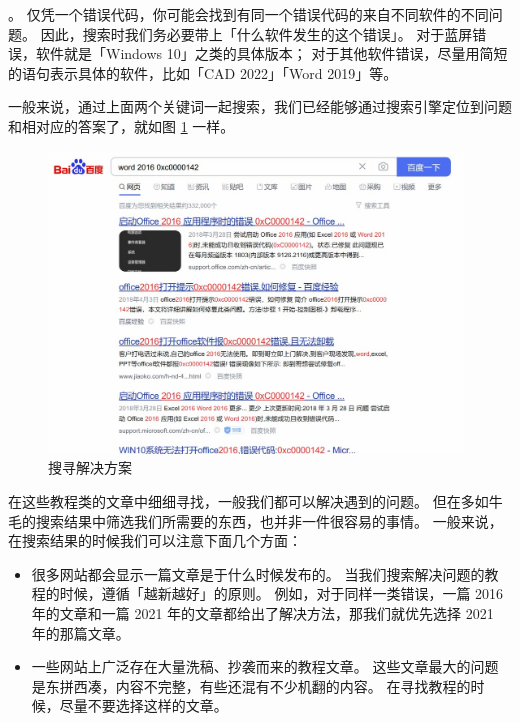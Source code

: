 。
仅凭一个错误代码，你可能会找到有同一个错误代码的来自不同软件的不同问题。
因此，搜索时我们务必要带上「什么软件发生的这个错误」。
对于蓝屏错误，软件就是「Windows 10」之类的具体版本；
对于其他软件错误，尽量用简短的语句表示具体的软件，比如「CAD 2022」「Word 2019」等。

一般来说，通过上面两个关键词一起搜索，我们已经能够通过搜索引擎定位到问题和相对应的答案了，就如图 \ref{Find_Solutions} 一样。

\begin{figure}[htb!]
  \centering
  \includegraphics[width=11cm]{assets/Find_Solutions.jpg}
  \caption{搜寻解决方案}
  \label{Find_Solutions}
\end{figure}

在这些教程类的文章中细细寻找，一般我们都可以解决遇到的问题。
但在多如牛毛的搜索结果中筛选我们所需要的东西，也并非一件很容易的事情。
一般来说，在搜索结果的时候我们可以注意下面几个方面：

\begin{itemize}
  \item {}
    很多网站都会显示一篇文章是于什么时候发布的。
    当我们搜索解决问题的教程的时候，遵循「越新越好」的原则。
    例如，对于同样一类错误，一篇 2016 年的文章和一篇 2021 年的文章都给出了解决方法，那我们就优先选择 2021 年的那篇文章。
  \item {}
  一些网站上广泛存在大量洗稿、抄袭而来的教程文章。
    这些文章最大的问题是东拼西凑，内容不完整，有些还混有不少机翻的内容。
    在寻找教程的时候，尽量不要选择这样的文章。
\end{itemize}

\practice

